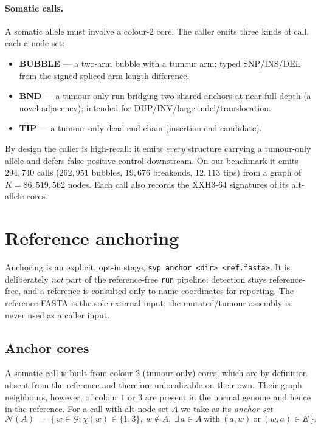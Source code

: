 \documentclass[11pt]{article}
\newcommand{\colour}{\chi}
\newcommand{\XXH}{\textsc{XXH3-64}}
\begin{document}
\paragraph{Somatic calls.}
A somatic allele must involve a colour-2 core. The caller emits three kinds of call, each a
node set:
\begin{itemize}[nosep]
\item \textbf{BUBBLE} --- a two-arm bubble with a tumour arm; typed SNP/INS/DEL from the signed
spliced arm-length difference.
\item \textbf{BND} --- a tumour-only run bridging two shared anchors at near-full depth (a novel
adjacency); intended for DUP/INV/large-indel/translocation.
\item \textbf{TIP} --- a tumour-only dead-end chain (insertion-end candidate).
\end{itemize}
By design the caller is high-recall: it emits \emph{every} structure carrying a tumour-only allele
and defers false-positive control downstream. On our benchmark it emits $294{,}740$ calls
($262{,}951$ bubbles, $19{,}676$ breakends, $12{,}113$ tips) from a graph of $K = 86{,}519{,}562$
nodes. Each call also records the \XXH{} signatures of its alt-allele cores.

\section{Reference anchoring}
\label{sec:anchor}

Anchoring is an explicit, opt-in stage, \texttt{svp anchor <dir> <ref.fasta>}. It is deliberately
\emph{not} part of the reference-free \texttt{run} pipeline: detection stays reference-free, and a
reference is consulted only to name coordinates for reporting. The reference FASTA is the sole
external input; the mutated/tumour assembly is never used as a caller input.

\subsection{Anchor cores}
A somatic call is built from colour-2 (tumour-only) cores, which are by definition absent from the
reference and therefore unlocalizable on their own. Their graph neighbours, however, of colour
$1$ or $3$ are present in the normal genome and hence in the reference. For a call with alt-node
set $A$ we take as its \emph{anchor set}
\begin{equation}
\mathcal{N}(A) \;=\; \{\, w \in \mathcal{G} : \colour(w) \in \{1,3\},\ w \notin A,\
\exists\, a\in A\ \text{with}\ (a,w)\ \text{or}\ (w,a)\in E \,\}.
\end{equation}
\end{document}

